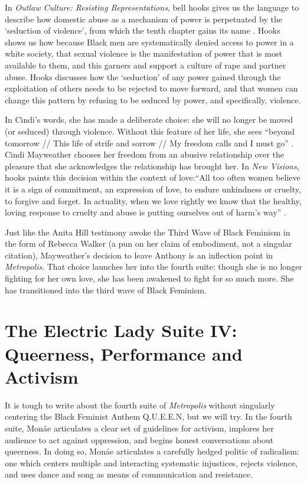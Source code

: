 \documentclass[a4paper, 11pt]{article} %
\begin{document}
In \emph{Outlaw Culture: Resisting Representations}, bell hooks gives us the language to describe how domestic abuse as a mechanism of power is perpetuated by the `seduction of violence', from which the tenth chapter gains its name \cite{hooks1994outlaw}.
Hooks shows us how because Black men are systematically denied access to power in a white society, that sexual violence is the manifestation of power that is most available to them, and this garners and support a culture of rape and partner abuse.
Hooks discusses how the `seduction' of any power gained through the exploitation of others needs to be rejected to move forward, and that women can change this pattern by refusing to be seduced by power, and specifically, violence.


In Cindi's words, she has made a deliberate choice: she will no longer be moved (or seduced) through violence. 
Without this feature of her life, she sees ``beyond tomorrow // This life of strife and sorrow // My freedom calls and I must go'' \cite{babopbyeya}.
Cindi Mayweather chooses her freedom from an abusive relationship over the pleasure that she acknowledges the relationship has brought her.
In \emph{New Visions}, hooks paints this decision within the context of love:``All too often women believe it is a sign of commitment, an expression of love, to endure unkindness or cruelty, to forgive and forget. In actuality, when we love rightly we know that the healthy, loving response to cruelty and abuse is putting ourselves out of harm's way'' \cite{newvisions}.

Just like the Anita Hill testimony awoke the Third Wave of Black Feminism in the form of Rebecca Walker \cite{rebeccawalker} (a pun on her claim of embodiment, not a singular citation), Mayweather's decision to leave Anthony is an inflection point in \emph{Metropolis}.
That choice launches her into the fourth suite: though she is no longer fighting for her own love, she has been awakened to fight for so much more. 
She has transitioned into the third wave of Black Feminism.



\section*{The Electric Lady Suite IV: Queerness, Performance and Activism}

It is tough to write about the fourth suite of \emph{Metropolis} without singularly centering the Black Feminist Anthem Q.U.E.E.N, but we will try.
In the fourth suite, Mon\'ae articulates a clear set of guidelines for activism, implores her audience to act against oppression, and begins honest conversations about queerness.
In doing so, Mon\'ae articulates a carefully hedged politic of radicalism: one which centers multiple and interacting systematic injustices, rejects violence, and uses dance and song as means of communication and resistance.
\end{document}
